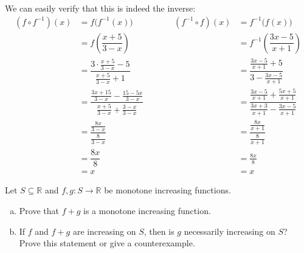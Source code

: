 \documentclass[11pt,letterpaper]{article}
\begin{document}
We can easily verify that this is indeed the inverse:
	\[
	\begin{aligned}
	(f \circ f^{-1})(x)&= f \big( f^{-1}(x) \big) \qquad\qquad& (f^{-1} \circ f)(x)&= f^{-1} \big( f(x) \big) \\[0.1cm]
	&= f \left( \dfrac{x + 5}{3 - x} \right) & &= f^{-1} \left( \dfrac{3x - 5}{x + 1} \right) \\[0.1cm]
	&= \dfrac{3 \cdot \frac{x + 5}{3 - x} - 5}{\frac{x + 5}{3 - x} + 1} & &= \dfrac{\frac{3x - 5}{x + 1} + 5}{3 - \frac{3x - 5}{x + 1}} \\[0.1cm]
	&= \dfrac{\frac{3x + 15}{3 - x} - \frac{15 - 5x}{3 - x}}{\frac{x + 5}{3 - x} + \frac{3 - x}{3 - x}} & &= \dfrac{\frac{3x - 5}{x + 1} + \frac{5x + 5}{x + 1}}{\frac{3x + 3}{x + 1} - \frac{3x - 5}{x + 1}} \\[0.1cm]
	&= \dfrac{\frac{8x}{3 - x}}{\frac{8}{3 - x}} & &= \dfrac{\frac{8x}{x + 1}}{\frac{8}{x + 1}} \\[0.1cm]
	&= \dfrac{8x}{8} & &= \frac{8x}{8} \\[0.1cm]
	&= x & &= x
	\end{aligned}
	\]



\newpage



 Let $S \subseteq \mathbb{R}$ and $f, g: S \to \mathbb{R}$ be monotone increasing functions. 
        \begin{enumerate}[(a)]
        \item Prove that $f + g$ is a monotone increasing function. 
        \item If $f$ and $f + g$ are increasing on $S$, then is $g$ necessarily increasing on $S$? Prove this statement or give a counterexample. 
        \end{enumerate} \pspace
\end{document}
